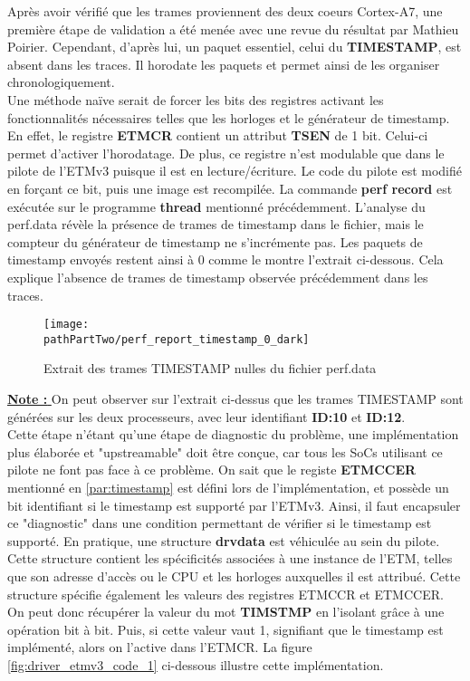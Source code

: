 Après avoir vérifié que les trames proviennent des deux coeurs Cortex-A7, une
première étape de validation a été menée avec une revue du résultat par
Mathieu Poirier. Cependant, d'après lui, un paquet essentiel, celui du
\textbf{TIMESTAMP}, est absent dans les traces. Il horodate les paquets et
permet ainsi de les organiser chronologiquement. \\

Une méthode naïve serait de forcer les bits des registres activant les
fonctionnalités nécessaires telles que les horloges et le générateur de
timestamp. En effet, le registre \textbf{ETMCR} contient un attribut
\textbf{TSEN} de 1 bit. Celui-ci permet d'activer l'horodatage. De plus, ce
registre n'est modulable que dans le pilote de l'ETMv3 puisque il est en
lecture/écriture. Le code du pilote est modifié en forçant ce bit, puis une
image est recompilée. La commande \textbf{perf record} est exécutée sur le
programme \textbf{thread} mentionné précédemment. L'analyse du perf.data
révèle la présence de trames de timestamp dans le fichier, mais le compteur du
générateur de timestamp ne s'incrémente pas. Les paquets de timestamp envoyés
restent ainsi à 0 comme le montre l'extrait ci-dessous. Cela explique
l'absence de trames de timestamp observée précédemment dans les traces. \\

\begin{figure}[H]
	\begin{center}
		\texttt{[image: \\pathPartTwo/perf\_report\_timestamp\_0\_dark]}
		\caption{Extrait des trames TIMESTAMP nulles du fichier perf.data}
	    \label{fig:perf_report_timestamp_0}
	\end{center}
\end{figure}

\underline{\textbf{Note : }} On peut observer sur l'extrait ci-dessus que les
trames TIMESTAMP sont générées sur les deux processeurs, avec leur identifiant
\textbf{ID:10} et \textbf{ID:12}. \\

Cette étape n'étant qu'une étape de diagnostic du problème, une implémentation
plus élaborée et "upstreamable" doit être conçue, car tous les SoCs utilisant
ce pilote ne font pas face à ce problème. On sait que le registe
\textbf{ETMCCER} mentionné en \ref{par:timestamp} est défini lors de
l'implémentation, et possède un bit identifiant si le timestamp est supporté
par l'ETMv3. Ainsi, il faut encapsuler ce "diagnostic" dans une condition
permettant de vérifier si le timestamp est supporté. En pratique, une
structure \textbf{drvdata} est véhiculée au sein du pilote. Cette structure
contient les spécificités associées à une instance de l'ETM, telles que son
adresse d'accès ou le CPU et les horloges auxquelles il est attribué. Cette
structure spécifie également les valeurs des registres ETMCCR et ETMCCER. On
peut donc récupérer la valeur du mot \textbf{TIMSTMP} en l'isolant grâce à une
opération bit à bit. Puis, si cette valeur vaut 1, signifiant que le timestamp
est implémenté, alors on l'active dans l'ETMCR. La figure
\ref{fig:driver_etmv3_code_1} ci-dessous illustre cette implémentation.

